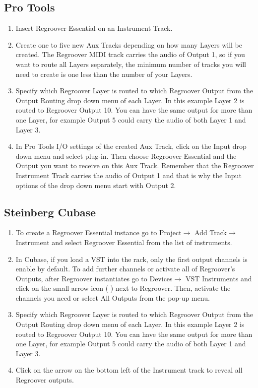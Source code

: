 \documentclass[12pt]{article}
\begin{document}
\subsection*{Pro Tools}
\begin{enumerate}
\item Insert Regroover Essential on an Instrument Track.
\item Create one to five new Aux Tracks depending on how many Layers will be created. The Regroover MIDI track carries the audio of Output 1, so if you want to route all Layers separately, the minimum number of tracks you will need to create is one less than the number of your Layers. 
\item Specify which Regroover Layer is routed to which Regroover Output from the Output Routing drop down menu of each Layer. In this example Layer 2 is routed to Regroover Output 10. You can have the same output for more than one Layer, for example Output 5 could carry the audio of both Layer 1 and Layer 3.
\item In Pro Tools I/O settings of the created Aux Track, click on the Input drop down menu and select plug-in. Then choose Regroover Essential and the Output you want to receive on this Aux Track. Remember that the Regroover Instrument Track carries the audio of Output 1 and that is why the Input options of the drop down menu start with Output 2.
\end{enumerate}

\subsection*{Steinberg Cubase}
\begin{enumerate}
\item To create a Regroover Essential instance go to Project$\rightarrow$ Add Track$\rightarrow$ Instrument and select Regroover Essential from the list of instruments.
\item In Cubase, if you load a VST into the rack, only the first output channels is enable by default. To add further channels or activate all of Regroover’s Outputs, after Regroover instantiates go to Devices$\rightarrow$ VST Instruments and click on the small arrow icon ( )  next to Regroover. Then, activate the channels you need or select All Outputs from the pop-up menu.
\item Specify which Regroover Layer is routed to which Regroover Output from the Output Routing drop down menu of each Layer. In this example Layer 2 is routed to Regroover Output 10. You can have the same output for more than one Layer, for example Output 5 could carry the audio of both Layer 1 and Layer 3.
\item Click on the arrow on the bottom left of the Instrument track to reveal all Regroover outputs.
\end{enumerate}
\end{document}

